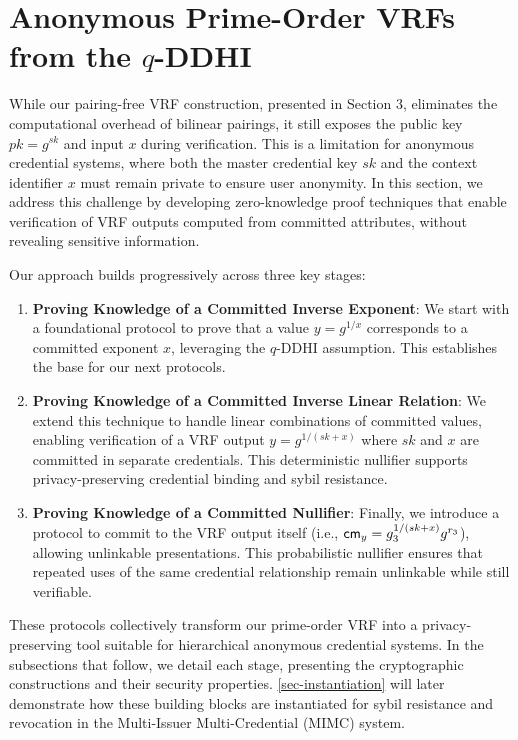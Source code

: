 \section{Anonymous Prime-Order VRFs from the $q$-DDHI}\label{sec:privacy-preserving-vrf}

While our pairing-free VRF construction, presented in Section 3, eliminates the computational overhead of bilinear pairings, it still exposes the public key $pk = g^{sk}$ and input $x$ during verification. This is a limitation for anonymous credential systems, where both the master credential key $sk$ and the context identifier $x$ must remain private to ensure user anonymity. In this section, we address this challenge by developing zero-knowledge proof techniques that enable verification of VRF outputs computed from committed attributes, without revealing sensitive information.

Our approach builds progressively across three key stages:

\begin{enumerate}
    \item \textbf{Proving Knowledge of a Committed Inverse Exponent}: We start with a foundational protocol to prove that a value $y = g^{1/x}$ corresponds to a committed exponent $x$, leveraging the $q$-DDHI assumption. This establishes the base for our next protocols.

    \item \textbf{Proving Knowledge of a Committed Inverse Linear Relation}: We extend this technique to handle linear combinations of committed values, enabling verification of a VRF output $y = g^{1/(sk + x)}$ where $sk$ and $x$ are committed in separate credentials. This deterministic nullifier supports privacy-preserving credential binding and sybil resistance.

    \item \textbf{Proving Knowledge of a Committed Nullifier}: Finally, we introduce a protocol to commit to the VRF output itself (i.e., $\mathsf{cm}_y = g_3^{1/(sk + x)} g^{r_3}$), allowing unlinkable presentations. This probabilistic nullifier ensures that repeated uses of the same credential relationship remain unlinkable while still verifiable.
\end{enumerate}

These protocols collectively transform our prime-order VRF into a privacy-preserving tool suitable for hierarchical anonymous credential systems. In the subsections that follow, we detail each stage, presenting the cryptographic constructions and their security properties. \ref{sec-instantiation} will later demonstrate how these building blocks are instantiated for sybil resistance and revocation in the Multi-Issuer Multi-Credential (MIMC) system.














